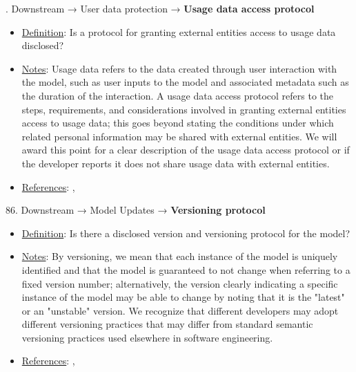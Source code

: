 . Downstream → User data protection → \textbf{Usage data access protocol}
\vspace{-\parskip}
\begin{itemize}
\item
\underline{Definition}: Is a protocol for granting external entities access to usage data disclosed?
\item
\underline{Notes}: Usage data refers to the data created through user interaction with the model, such as user inputs to the model and associated metadata such as the duration of the interaction. A usage data access protocol refers to the steps, requirements, and considerations involved in granting external entities access to usage data; this goes beyond stating the conditions under which related personal information may be shared with external entities. We will award this point for a clear description of the usage data access protocol or if the developer reports it does not share usage data with external entities.
\item
\underline{References}: \citet{lapowsky2018cambridge}, \citet{king2020privacy}
\end{itemize} \vspace{\baselineskip}


86. Downstream → Model Updates → \textbf{Versioning protocol}
\vspace{-\parskip}
\begin{itemize}
\item
\underline{Definition}: Is there a disclosed version and versioning protocol for the model?
\item
\underline{Notes}: By versioning, we mean that each instance of the model is uniquely identified and that the model is guaranteed to not change when referring to a fixed version number; alternatively, the version clearly indicating a specific instance of the model may be able to change by noting that it is the "latest" or an "unstable" version. We recognize that different developers may adopt different versioning practices that may differ from standard semantic versioning practices used elsewhere in software engineering.
\item
\underline{References}: \citet{chen2023chatgpts}, \citet{Lam2020}
\end{itemize} \vspace{\baselineskip}


